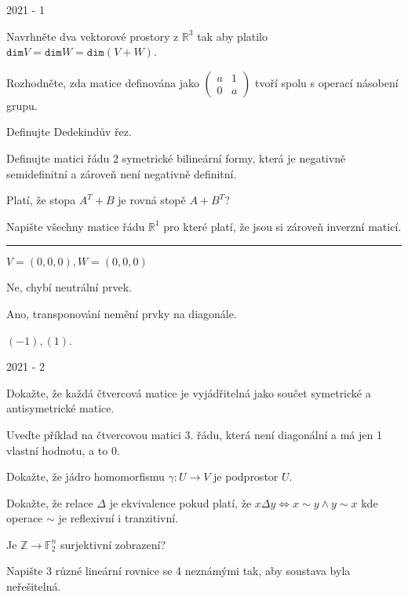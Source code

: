 \newpage
{\large 2021 - 1}

\begin{questions}

\question Navrhněte dva vektorové prostory z \(\mathbb{R}^3\) tak aby platilo \(\texttt{dim} V = \texttt{dim} W = \texttt{dim}(V + W)\).

\question Rozhodněte, zda matice definována jako \(\begin{pmatrix}
    a & 1\\
    0 & a
\end{pmatrix}\) tvoří spolu s operací násobení grupu.

\question Definujte Dedekindův řez.

\question Definujte matici řádu 2 symetrické bilineární formy, která je negativně semidefinitní a zároveň není negativně definitní.

\question Platí, že stopa \(A^T + B\) je rovná stopě \(A + B^T\)?

\question Napište všechny matice řádu \(\mathbb{R}^1\) pro které platí, že jsou si zároveň inverzní maticí.

\end{questions}

\hrule

\begin{questions}

{\color{gray}

\question \(V = (0,0,0), W = (0,0,0)\)

\question Ne, chybí neutrální prvek.

\question

\question

\question Ano, transponování nemění prvky na diagonále.

\question \((-1), (1)\).

}

\end{questions}

\newpage
{\large 2021 - 2}

\begin{questions}

\question Dokažte, že každá čtvercová matice je vyjádřitelná jako součet symetrické a antisymetrické matice.

\question Uveďte příklad na čtvercovou matici 3. řádu, která není diagonální a má jen 1 vlastní hodnotu, a to 0.

\question Dokažte, že jádro homomorfismu \(\gamma: U \rightarrow V\) je podprostor \(U\).

\question Dokažte, že relace \(\Delta\) je ekvivalence pokud platí, že \(x \Delta y \Leftrightarrow x \sim y \wedge y \sim x\) kde operace \(\sim\) je reflexivní i tranzitivní.

\question Je \(\mathbb{Z} \rightarrow \mathbb{F}_2^n\) surjektivní zobrazení?

\question Napište 3 různé lineární rovnice se 4 neznámými tak, aby soustava byla neřešitelná.

\end{questions}

